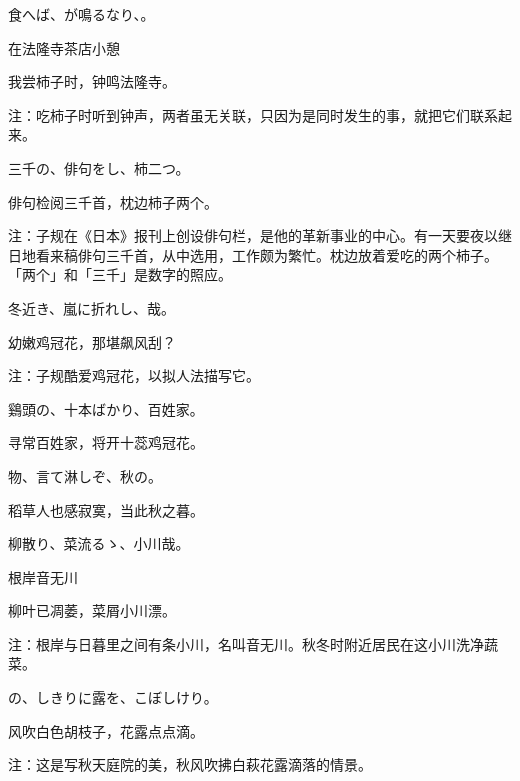 \begin{haiku}
    {\FH {}食へば、が鳴るなり、。}

    {\FK 在法隆寺茶店小憩}

    {\FK 我尝柿子时，钟鸣法隆寺。}

    {\FT 注：吃柿子时听到钟声，两者虽无关联，只因为是同时发生的事，就把它们联系起来。}
\end{haiku}

\begin{haiku}
    {\FH 三千の、俳句をし、柿二つ。}

    {\FK 俳句检阅三千首，枕边柿子两个。}

    {\FT 注：子规在《日本》报刊上创设俳句栏，是他的革新事业的中心。有一天要夜以继日地看来稿俳句三千首，从中选用，工作颇为繁忙。枕边放着爱吃的两个柿子。「两个」和「三千」是数字的照应。}
\end{haiku}

\begin{haiku}
    {\FH 冬近き、嵐に折れし、哉。}

    {\FK 幼嫩鸡冠花，那堪飙风刮？}

    {\FT 注：子规酷爱鸡冠花，以拟人法描写它。}
\end{haiku}

\begin{haiku}
    {\FH 鷄頭の、十本ばかり、百姓家。}

    {\FK 寻常百姓家，将开十蕊鸡冠花。}
\end{haiku}

\begin{haiku}
    {\FH {}物、言て淋しぞ、秋の。}

    {\FK 稻草人也感寂寞，当此秋之暮。}
\end{haiku}

\begin{haiku}
    {\FH 柳散り、菜流るゝ、小川哉。}

    {\FK 根岸音无川}

    {\FK 柳叶已凋萎，菜屑小川漂。}

    {\FT 注：根岸与日暮里之间有条小川，名叫音无川。秋冬时附近居民在这小川洗净蔬菜。}
\end{haiku}

\begin{haiku}
    {\FH {}の、しきりに露を、こぼしけり。}

    {\FK 风吹白色胡枝子，花露点点滴。}

    {\FT 注：这是写秋天庭院的美，秋风吹拂白萩花露滴落的情景。}
\end{haiku}

